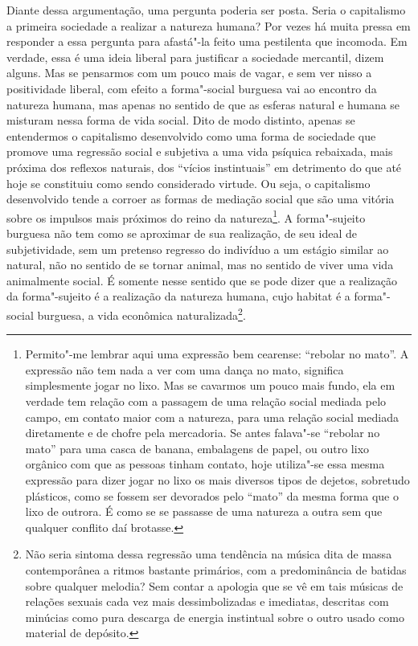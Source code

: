 Diante dessa argumentação, uma pergunta poderia ser posta. Seria o
capitalismo a primeira sociedade a realizar a natureza humana? Por vezes
há muita pressa em responder a essa pergunta para afastá"-la feito uma
pestilenta que incomoda. Em verdade, essa é uma ideia liberal para
justificar a sociedade mercantil, dizem alguns. Mas se pensarmos com um
pouco mais de vagar, e sem ver nisso a positividade liberal, com efeito
a forma"-social burguesa vai ao encontro da natureza humana, mas apenas
no sentido de que as esferas natural e humana se misturam nessa forma de
vida social. Dito de modo distinto, apenas se entendermos o capitalismo
desenvolvido como uma forma de sociedade que promove uma regressão
social e subjetiva a uma vida psíquica rebaixada, mais próxima dos
reflexos naturais, dos ``vícios instintuais'' em detrimento do que até
hoje se constituiu como sendo considerado virtude. Ou seja, o
capitalismo desenvolvido tende a corroer as formas de mediação social
que são uma vitória sobre os impulsos mais próximos do reino da
natureza\footnote{Permito"-me lembrar aqui uma expressão bem cearense:
  ``rebolar no mato''. A expressão não tem nada a ver com uma dança no
  mato, significa simplesmente jogar no lixo. Mas se cavarmos um pouco
  mais fundo, ela em verdade tem relação com a passagem de uma relação
  social mediada pelo campo, em contato maior com a natureza, para uma
  relação social mediada diretamente e de chofre pela mercadoria. Se
  antes falava"-se ``rebolar no mato'' para uma casca de banana,
  embalagens de papel, ou outro lixo orgânico com que as pessoas tinham
  contato, hoje utiliza"-se essa mesma expressão para dizer jogar no lixo
  os mais diversos tipos de dejetos, sobretudo plásticos, como se fossem
  ser devorados pelo ``mato'' da mesma forma que o lixo de outrora. É
  como se se passasse de uma natureza a outra sem que qualquer conflito
  daí brotasse.}. A forma"-sujeito burguesa não tem como se aproximar de
sua realização, de seu ideal de subjetividade, sem um pretenso regresso
do indivíduo a um estágio similar ao natural, não no sentido de se
tornar animal, mas no sentido de viver uma vida animalmente social. É
somente nesse sentido que se pode dizer que a realização da
forma"-sujeito é a realização da natureza humana, cujo habitat é a
forma"-social burguesa, a vida econômica naturalizada\footnote{Não seria
  sintoma dessa regressão uma tendência na música dita de massa
  contemporânea a ritmos bastante primários, com a predominância de
  batidas sobre qualquer melodia? Sem contar a apologia que se vê em
  tais músicas de relações sexuais cada vez mais dessimbolizadas e
  imediatas, descritas com minúcias como pura descarga de energia
  instintual sobre o outro usado como material de depósito.}.

